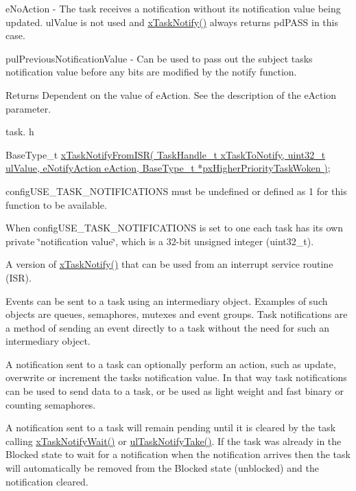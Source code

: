 e\+No\+Action -\/ The task receives a notification without its notification value being updated. ul\+Value is not used and \hyperlink{vendor_2ceedling_2plugins_2freertos_2src_2freertos_2include_2task_8h_a0d2d54fb8a64011dfbb54983e4ed06bd}{x\+Task\+Notify()} always returns pd\+P\+A\+SS in this case.

pul\+Previous\+Notification\+Value -\/ Can be used to pass out the subject task\textquotesingle{}s notification value before any bits are modified by the notify function.

\begin{DoxyReturn}{Returns}
Dependent on the value of e\+Action. See the description of the e\+Action parameter.
\end{DoxyReturn}
task. h 
\begin{DoxyPre}BaseType\_t \hyperlink{vendor_2ceedling_2plugins_2freertos_2src_2freertos_2include_2task_8h_a1ed9129068b96a909356bd0369c5ecb0}{xTaskNotifyFromISR( TaskHandle\_t xTaskToNotify, uint32\_t ulValue, eNotifyAction eAction, BaseType\_t *pxHigherPriorityTaskWoken )};\end{DoxyPre}


config\+U\+S\+E\+\_\+\+T\+A\+S\+K\+\_\+\+N\+O\+T\+I\+F\+I\+C\+A\+T\+I\+O\+NS must be undefined or defined as 1 for this function to be available.

When config\+U\+S\+E\+\_\+\+T\+A\+S\+K\+\_\+\+N\+O\+T\+I\+F\+I\+C\+A\+T\+I\+O\+NS is set to one each task has its own private \char`\"{}notification value\char`\"{}, which is a 32-\/bit unsigned integer (uint32\+\_\+t).

A version of \hyperlink{vendor_2ceedling_2plugins_2freertos_2src_2freertos_2include_2task_8h_a0d2d54fb8a64011dfbb54983e4ed06bd}{x\+Task\+Notify()} that can be used from an interrupt service routine (I\+SR).

Events can be sent to a task using an intermediary object. Examples of such objects are queues, semaphores, mutexes and event groups. Task notifications are a method of sending an event directly to a task without the need for such an intermediary object.

A notification sent to a task can optionally perform an action, such as update, overwrite or increment the task\textquotesingle{}s notification value. In that way task notifications can be used to send data to a task, or be used as light weight and fast binary or counting semaphores.

A notification sent to a task will remain pending until it is cleared by the task calling \hyperlink{vendor_2ceedling_2plugins_2freertos_2src_2freertos_2include_2task_8h_a0475fcda9718f403521c270a7270ff93}{x\+Task\+Notify\+Wait()} or \hyperlink{vendor_2ceedling_2plugins_2freertos_2src_2freertos_2include_2task_8h_a66540bef602522a01a519f776e4c07d8}{ul\+Task\+Notify\+Take()}. If the task was already in the Blocked state to wait for a notification when the notification arrives then the task will automatically be removed from the Blocked state (unblocked) and the notification cleared.

